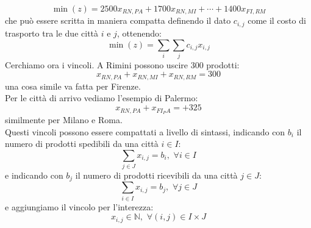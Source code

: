 \documentclass[a4paper,12pt, oneside]{book}
\begin{document}
\begin{esercizio}
\[\min(z)= 2500x_{RN, PA} + 1700x_{RN, MI}+\cdots + 1400x_{FI,RM}\]
che può essere scritta in maniera compatta definendo il dato $c_{i,j}$ come il
costo di trasporto tra le due città $i$ e $j$, ottenendo:
\[\min(z)=\sum_i\sum_jc_{i,j}x_{i,j}\]
Cerchiamo ora i vincoli. A Rimini possono uscire 300 prodotti:
\[x_{RN,PA}+x_{RN,MI}+x_{RN,RM}=300\]
una cosa simile va fatta per Firenze.\\
Per le città di arrivo vediamo l'esempio di Palermo:
\[x_{RN,PA}+x_{FI_PA}=+325\]
similmente per Milano e Roma.\\
Questi vincoli possono essere compattati a livello di sintassi,
indicando con $b_i$ il numero di prodotti spedibili da una città $i\in
I$:
\[\sum_{j\in J}x_{i,j}=b_i,\,\, \forall i \in I\]
e indicando con $b_j$ il numero di prodotti ricevibili da una città
$j\in J$:
\[\sum_{i\in I}x_{i,j}=b_j,\,\,\forall j \in J\]
e aggiungiamo il vincolo per l'interezza:
\[x_{i,j}\in\mathbb{N},\,\,\forall (i,j)\in I\times J\]
\end{esercizio}
\end{document}
